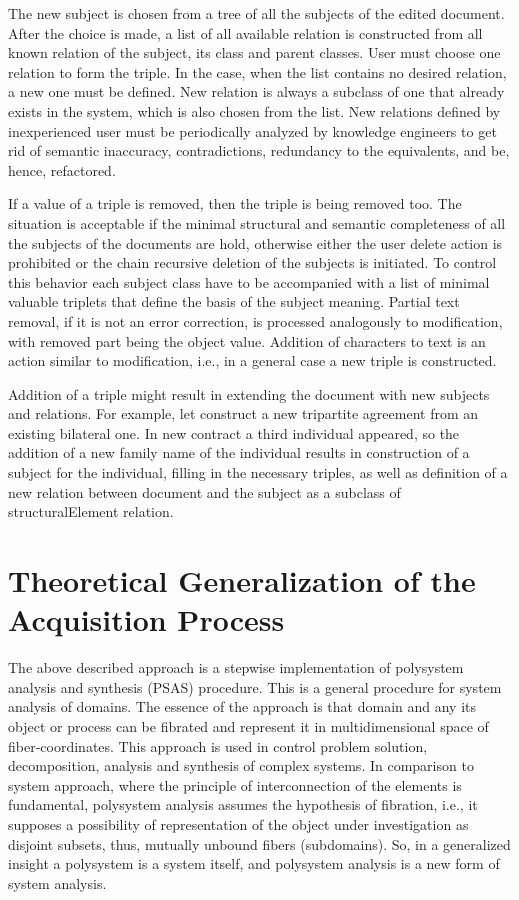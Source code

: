 \documentclass[conference]{IEEEtran}
\begin{document}
{{The new subject is chosen from a tree of all the subjects of the edited document. After the choice is made, a list of all available relation is constructed from all known relation of the subject, its class and parent classes. User must choose one relation to form the triple. In the case, when the list contains no desired relation, a new one must be defined. New relation is always a subclass of one that already exists in the system, which is also chosen from the list. New relations defined by inexperienced user must be periodically analyzed by knowledge engineers to get rid of semantic inaccuracy, contradictions, redundancy to the equivalents, and be, hence, refactored.

If a value of a triple is removed, then the triple is being removed too. The situation is acceptable if the minimal structural and semantic completeness of all the subjects of the documents are hold, otherwise either the user delete action is prohibited or the chain recursive deletion of the subjects is initiated. To control this behavior each subject class have to be accompanied with a list of minimal valuable triplets that define the basis of the subject meaning. Partial text removal, if it is not an error correction, is processed analogously to modification, with removed part being the object value. Addition of characters to text is an action similar to modification, i.e., in a general case a new triple is constructed.

Addition of a triple might result in extending the document with new subjects and relations. For example, let construct a new tripartite agreement from an existing bilateral one. In new contract a third individual appeared, so the addition of a new family name of the individual results in construction of a subject for the individual, filling in the necessary triples, as well as definition of a new relation between document and the subject as a subclass of structuralElement relation.

\section{Theoretical Generalization of the Acquisition Process}

The above described approach is a stepwise implementation of polysystem analysis and synthesis \cite{father} (PSAS) procedure. This is a general procedure for system analysis of domains. The essence of the approach is that domain and any its object or process can be fibrated and represent it in multidimensional space of fiber-coordinates. This approach is used in control problem solution, decomposition, analysis and synthesis of complex systems. In comparison to system approach, where the principle of interconnection of the elements is fundamental, polysystem analysis assumes the hypothesis of fibration, i.e., it supposes a possibility of representation of the object under investigation as disjoint subsets, thus, mutually unbound fibers (subdomains). So, in a generalized insight a polysystem is a system itself, and polysystem analysis is a new form of system analysis.

}}
\end{document}
